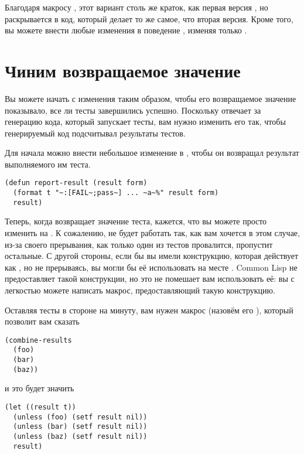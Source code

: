 Благодаря макросу , этот вариант столь же краток, как первая версия
, но раскрывается в код, который делает то же самое, что вторая версия. Кроме
того, вы можете внести любые изменения в поведение , изменяя только
.

\section{Чиним возвращаемое значение}

Вы можете начать с изменения  таким образом, чтобы его возвращаемое значение
показывало, все ли тесты завершились успешно. Поскольку  отвечает за генерацию
кода, который запускает тесты, вам нужно изменить его так, чтобы генерируемый код
подсчитывал результаты тестов.

Для начала можно внести небольшое изменение в , чтобы он возвращал
результат выполняемого им теста.

\begin{lstlisting}
(defun report-result (result form)
  (format t "~:[FAIL~;pass~] ... ~a~%" result form)
  result)
\end{lstlisting}

Теперь, когда  возвращает значение теста, кажется, что вы можете
просто изменить  на . К сожалению,  не будет работать так,
как вам хочется в этом случае, из-за своего прерывания, как только один из тестов
провалится,  пропустит остальные. С другой стороны, если бы вы имели
конструкцию, которая действует как , но не прерываясь, вы могли бы её
использовать на месте . Common Lisp не предоставляет такой конструкции, но это
не помешает вам использовать её: вы с легкостью можете написать макрос, предоставляющий
такую конструкцию.

Оставляя тесты в стороне на минуту, вам нужен макрос (назовём его ),
который позволит вам сказать

\begin{lstlisting}
(combine-results
  (foo)
  (bar)
  (baz))
\end{lstlisting}

и это будет значить

\begin{lstlisting}
(let ((result t))
  (unless (foo) (setf result nil))
  (unless (bar) (setf result nil))
  (unless (baz) (setf result nil))
  result)
\end{lstlisting}

